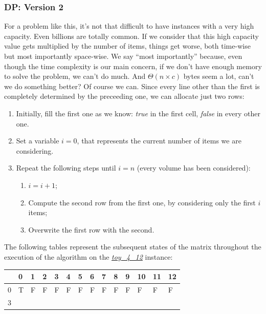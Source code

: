 \documentclass[12pt]{extarticle}
\begin{document}
\subsubsection{DP: Version 2}
\label{CPU-dp-v2}
For a problem like this, it's not that difficult to have instances with a very high capacity. Even billions are totally common. If we consider that this high capacity value gets multiplied by the number of items, things get worse, both time-wise but most importantly space-wise. We say ``most importantly'' because, even though the time complexity is our main concern, if we don't have enough memory to solve the problem, we can't do much. And $\Theta(n \times c)$ bytes seem a lot, can't we do something better? Of course we can.\newline
Since every line other than the first is completely determined by the preceeding one, we can allocate just two rows:
\begin{enumerate}
    \item Initially, fill the first one as we know: \emph{true} in the first cell, \emph{false} in every other one.
    \item Set a variable $i = 0$, that represents the current number of items we are considering.
    \item Repeat the following steps until $i = n$ (every volume has been considered):
    \begin{enumerate}
        \item $i = i + 1$;
        \item Compute the second row from the first one, by considering only the first $i$ items;
        \item Overwrite the first row with the second.
    \end{enumerate}
\end{enumerate}
The following tables represent the subsequent states of the matrix throughout the execution of the algorithm on the \hyperref[marker-toy-4-12]{\emph{toy\_4\_12}} instance:
\begin{center}
\begin{tabular}{| m{0.6cm} | m{0.6cm}| m{0.6cm} | m{0.6cm} | m{0.6cm} | m{0.6cm} | m{0.6cm} | m{0.6cm} | m{0.6cm}| m{0.6cm} | m{0.6cm} | m{0.6cm} | m{0.6cm} | m{0.6cm} |}
 \hline
 & 0 & 1 & 2 & 3 & 4 & 5 & 6 & 7 & 8 & 9 & 10 & 11 & 12\\
 \hline
0 & T & F & F & F & F & F & F & F & F & F & F & F & F\\
\hline
3 &  &  &  &  &  &  &  &  &  &  &  &  & \\
\hline
\end{tabular}
\end{center}
\end{document}
